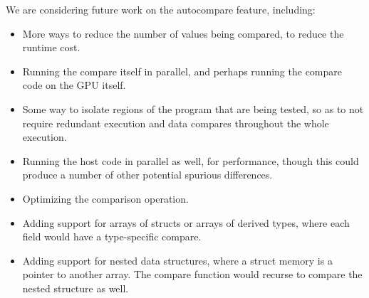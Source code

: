 We are considering future work on the autocompare feature, including:
\begin{itemize}
\item More ways to reduce the number of values being compared, to reduce the runtime cost.
\item Running the compare itself in parallel, and perhaps running the compare code on the GPU itself.
\item Some way to isolate regions of the program that are being tested, so as to not require redundant execution and data compares throughout the whole execution.
\item Running the host code in parallel as well, for performance, though this could produce a number of other potential spurious differences.
\item Optimizing the comparison operation.
\item Adding support for arrays of structs or arrays of derived types, where each field would have a type-specific compare.
\item Adding support for nested data structures, where a struct memory is a pointer to another array.
The compare function would recurse to compare the nested structure as well.
\end{itemize}
